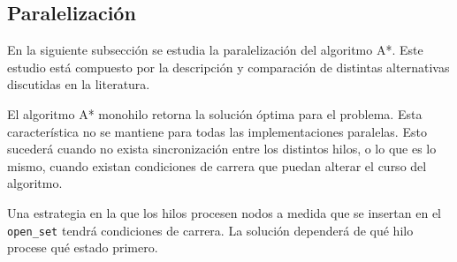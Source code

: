 \pagebreak

\subsection{Paralelización}

En la siguiente subsección
se estudia la paralelización
del algoritmo A*.
Este estudio está compuesto por la descripción y
comparación de distintas alternativas discutidas en
la literatura.

El algoritmo A* monohilo retorna la solución óptima
para el problema.
Esta característica no se mantiene para todas las
implementaciones paralelas.
Esto sucederá cuando no exista sincronización
entre los distintos hilos,
o lo que es lo mismo,
cuando existan condiciones de carrera
que puedan alterar el curso del algoritmo.

\begin{examplebox}
    Una estrategia en la que los hilos procesen nodos
    a medida que se insertan en el \lstinline{open_set}
    tendrá condiciones de carrera.
    La solución dependerá de qué hilo procese qué estado
    primero.
\end{examplebox}







    

